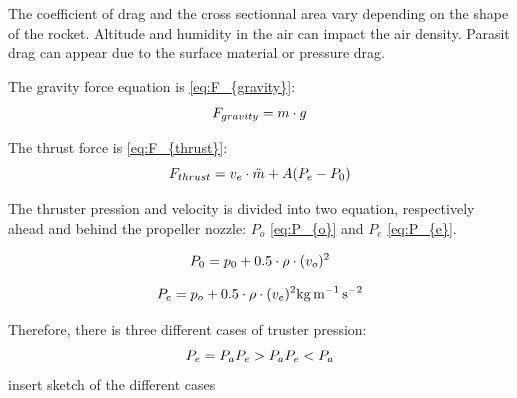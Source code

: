 		The coefficient of drag and the cross sectionnal area vary depending on the shape of the rocket. Altitude and humidity in the air can impact the air density. Parasit drag can appear due to the surface material or pressure drag.
		
		The gravity force equation is \vref{eq:F_{gravity}}:
		\begin{equation}
		F_{gravity} = m \cdot g \addunit{\newton} \label{eq:F_{gravity}}
		\end{equation}
		\startexplain
		\stopexplain
			
		
		The thrust force is \vref{eq:F_{thrust}}:
		\begin{equation}
		F_{thrust} = v_{e} \cdot \ddot{m} + A (P_{e} -P_{0}) \addunit{\newton} \label{eq:F_{thrust}}
		\end{equation}
		\startexplain
		\stopexplain
		
		
		The thruster pression and velocity is divided into two equation, respectively ahead and behind the propeller nozzle: $P_{o}$ \vref{eq:P_{o}} and $P_{e}$ \vref{eq:P_{e}}.
		
		\begin{equation}
		P_{0} = p_{0} + 0.5 \cdot \rho \cdot(v_{o})^2 \addunit{\kilo\gram\per\meter\per\second\squared} \label{eq:P_{o}}
		\end{equation}
		\startexplain
		\stopexplain
		
		\begin{equation}
		P_{e} = p_{o} + 0.5 \cdot \rho \cdot(v_{e})^2 \si{\kilo\gram\per\meter\per\second\squared} \label{eq:P_{e}}
		\end{equation}
		\startexplain
		\stopexplain
		
		Therefore, there is three different cases of truster pression:
		\begin{equation}
		P_{e} = P_{a} \notag
		 P_{e} > P_{a} \notag
		 P_{e} < P_{a} \notag
		\end{equation}
		 insert sketch of the different cases
		 
